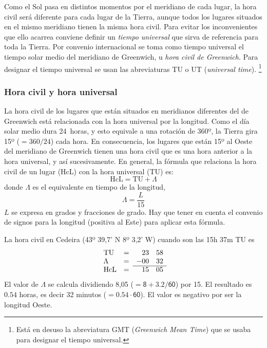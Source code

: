 
Como el Sol pasa en distintos momentos por el meridiano de cada lugar, la hora civil será diferente para cada lugar de la Tierra, aunque todos los lugares situados en el mismo meridiano tienen la misma hora civil. Para evitar los inconvenientes que ello acarrea conviene definir un \emph{tiempo universal} que sirva de referencia para toda la Tierra. Por convenio internacional se toma como tiempo universal el tiempo solar medio del meridiano de Greenwich, u \emph{hora civil de Greenwich}. Para designar el tiempo universal se usan las abreviaturas TU o UT (\emph{universal time}).%
\footnote{Está en desuso la abreviatura GMT (\emph{Greenwich Mean Time}) que se usaba para designar el tiempo universal.}

\subsubsection{Hora civil y hora universal}


La hora civil de los lugares que están situados en meridianos diferentes del de Greenwich está relacionada con la hora universal por la longitud. Como el día solar medio dura 24~horas, y esto equivale a una rotación de 360º, la Tierra gira 15º ($= 360/24$) cada hora. En consecuencia, los lugares que están 15º al Oeste del meridiano de Greenwich tienen 
una hora civil que es una hora anterior a la hora universal, y así sucesivamente. En general, la fórmula que relaciona la hora civil de un lugar (HcL) con la hora universal (TU) es: 
\begin{equation}
\mathrm{HcL} = \mathrm{TU} + \Lambda
\end{equation}
donde $\Lambda$ es el equivalente en tiempo de la longitud, 
\begin{equation}
\Lambda = \frac{L}{15}
\end{equation}
$L$ se expresa en grados y fracciones de grado. Hay que tener en cuenta el convenio de signos para la longitud (positiva al Este) para aplicar esta fórmula. 

\begin{ejemplo}
La hora civil en Cedeira (43º 39,7’ N 8º 3,2’ W) cuando son las 15h 37m TU es 
\[
\begin{array}{lcrr}
  \mathrm{TU} &  =  &   23 & 58 \\
  \Lambda        &  =  &   -00 & 32\\ \cline{3-4}
  \mathrm{HcL} &   = &   15 &05\\
\end{array}
\]
El valor de $\Lambda$ se calcula dividiendo 8,05 ($\mathsf{= 8+3.2/60}$) por 15. El resultado es $0.54$ horas, es decir 32 minutos ($\mathsf{=0.54 \cdot 60}$). El valor es negativo por ser la longitud Oeste. 
\end{ejemplo}

